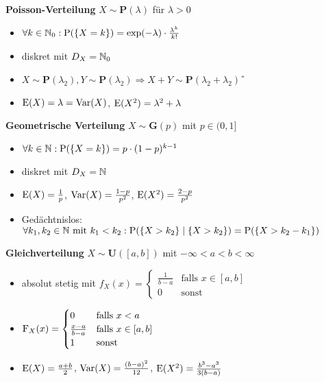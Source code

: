 \textbf{Poisson-Verteilung} $X\sim\mathbf{P}(\lambda)$ für $\lambda>0$
\begin{itemize}
\item $\forall k\in\mathbb{N}_0:\operatorname{P}(\{X=k\})=\exp(-\lambda)\cdot\frac{\lambda^k}{k!}$

\item diskret mit $D_X=\mathbb{N}_0$

\item $X\sim\mathbf{P}(\lambda_2), Y\sim\mathbf{P}(\lambda_2)
\Rightarrow X+Y\sim\mathbf{P}(\lambda_2 + \lambda_2)$ \U

\item $\operatorname{E}(X)=\lambda=\operatorname{Var}(X)$, $\operatorname{E}(X^2)=\lambda^2+\lambda$
\end{itemize}

\textbf{Geometrische Verteilung} $X\sim\mathbf{G}(p)$ mit $p\in\textbf{(}0,1]$
\begin{itemize}
\item $\forall k\in\mathbb{N}:\operatorname{P}(\{X=k\})=p\cdot(1-p)^{k-1}$

\item diskret mit $D_X=\mathbb{N}$

\item $\operatorname{E}(X)=\frac{1}{p}$, $\operatorname{Var}(X)=\frac{1-p}{p^2}$, $\operatorname{E}(X^2)=\frac{2-p}{p^2}$

\item Gedächtnislos: $\forall k_1,k_2\in\mathbb{N} \text{ mit } k_1<k_2:
\operatorname{P}(\{X>k_2\}\mid \{ X>k_2\}) = \operatorname{P}(\{X>k_2-k_1\})$\\
\end{itemize}

\textbf{Gleichverteilung} $X\sim\mathbf{U}([a,b])$ mit $-\infty<a<b<\infty$
\begin{itemize}
\item absolut stetig mit 
$f_X(x)=\begin{cases}
\frac{1}{b-a} 	& \text{falls } x\in [a,b]	\\
0				& \text{sonst }		
\end{cases}$

\item
$\operatorname{F}_X(x)=\begin{cases}
0 				& \text{falls } x<a			\\
\frac{x-a}{b-a}	& \text{falls } x\in [a,b]	\\
1				& \text{sonst}
\end{cases}$

\item $\operatorname{E}(X)=\frac{a+b}{2}$, $\operatorname{Var}(X)=\frac{(b-a)^2}{12}$,
$\operatorname{E}(X^2)=\frac{b^3-a^3}{3(b-a)}$
\end{itemize}

